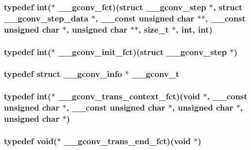 \subsubsection[{\_\-\_\-gconv\_\-fct}]{\setlength{\rightskip}{0pt plus 5cm}typedef int($\ast$ {\bf \_\-\_\-gconv\_\-fct})(struct {\bf \_\-\_\-gconv\_\-step} $\ast$, struct {\bf \_\-\_\-gconv\_\-step\_\-data} $\ast$, \_\-\_\-const unsigned char $\ast$$\ast$, \_\-\_\-const unsigned char $\ast$, unsigned char $\ast$$\ast$, {\bf size\_\-t} $\ast$, int, int)}\label{tp_8c_a42aea8ba7a23ab5cf143407967ff6a7a}
\subsubsection[{\_\-\_\-gconv\_\-init\_\-fct}]{\setlength{\rightskip}{0pt plus 5cm}typedef int($\ast$ {\bf \_\-\_\-gconv\_\-init\_\-fct})(struct {\bf \_\-\_\-gconv\_\-step} $\ast$)}\label{tp_8c_aba444fe3b3c533751d379efebbb38dab}
\subsubsection[{\_\-\_\-gconv\_\-t}]{\setlength{\rightskip}{0pt plus 5cm}typedef struct {\bf \_\-\_\-gconv\_\-info}                      $\ast$ {\bf \_\-\_\-gconv\_\-t}}\label{tp_8c_aaea8aa865f30f5c1d9219070a5b5860a}
\subsubsection[{\_\-\_\-gconv\_\-trans\_\-context\_\-fct}]{\setlength{\rightskip}{0pt plus 5cm}typedef int($\ast$ {\bf \_\-\_\-gconv\_\-trans\_\-context\_\-fct})(void $\ast$, \_\-\_\-const unsigned char $\ast$, \_\-\_\-const unsigned char $\ast$, unsigned char $\ast$, unsigned char $\ast$)}\label{tp_8c_a2a98d80e28c5d60eadb8537d7a371f8f}
\subsubsection[{\_\-\_\-gconv\_\-trans\_\-end\_\-fct}]{\setlength{\rightskip}{0pt plus 5cm}typedef void($\ast$ {\bf \_\-\_\-gconv\_\-trans\_\-end\_\-fct})(void $\ast$)}\label{tp_8c_ab8b733d1125d2a023ca1831b2b775508}
